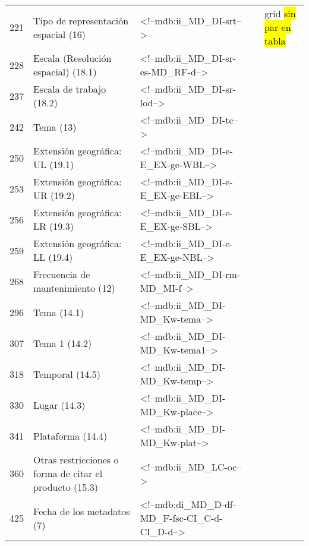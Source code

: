 \documentclass{GVT_CONAE_Class}
\begin{document}
\begin{landscape}
\begin{longtable}[c]{| p{1.5cm} | p{4cm} | p{6cm} | p{4cm}| p{6cm} |}
221 & Tipo de representación espacial (16) & <!--mdb:ii\_MD\_DI-srt--> & & grid \hl{sin par en tabla}\\
228 & Escala (Resolución espacial) (18.1) & <!--mdb:ii\_MD\_DI-sr-es-MD\_RF-d--> & \\
237 & Escala de trabajo (18.2) & <!--mdb:ii\_MD\_DI-sr-lod--> & \\
242 & Tema (13) & <!--mdb:ii\_MD\_DI-tc--> & \\
250 & Extensión geográfica: UL (19.1) & <!--mdb:ii\_MD\_DI-e-E\_EX-ge-WBL--> & \\
253 & Extensión geográfica: UR (19.2) & <!--mdb:ii\_MD\_DI-e-E\_EX-ge-EBL--> & \\
256 & Extensión geográfica: LR (19.3) & <!--mdb:ii\_MD\_DI-e-E\_EX-ge-SBL--> & \\
259 & Extensión geográfica: LL (19.4) & <!--mdb:ii\_MD\_DI-e-E\_EX-ge-NBL--> & \\
268 & Frecuencia de mantenimiento (12) & <!--mdb:ii\_MD\_DI-rm-MD\_MI-f--> & \\
296 & Tema (14.1) & <!--mdb:ii\_MD\_DI-MD\_Kw-tema--> & \\
307 & Tema 1 (14.2) & <!--mdb:ii\_MD\_DI-MD\_Kw-tema1--> & \\
318 & Temporal (14.5) & <!--mdb:ii\_MD\_DI-MD\_Kw-temp--> & \\
330 & Lugar (14.3) & <!--mdb:ii\_MD\_DI-MD\_Kw-place--> & \\
341 & Plataforma (14.4) & <!--mdb:ii\_MD\_DI-MD\_Kw-plat--> & \\
360 & Otras restricciones o forma de citar el producto (15.3) & <!--mdb:ii\_MD\_LC-oc--> & \\
425 & Fecha de los metadatos (7) & <!--mdb:di\_MD\_D-df-MD\_F-fsc-CI\_C-d-CI\_D-d--> & \\
 
\end{longtable}
\end{landscape}
\end{document}
